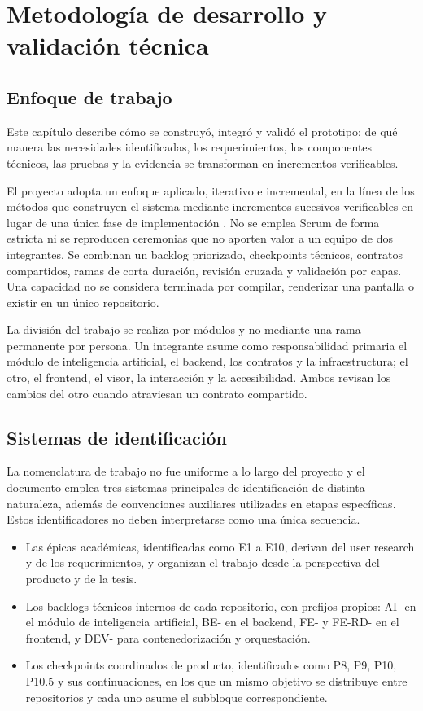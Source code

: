 \chapter{Metodología de desarrollo y validación técnica}
\label{chap:metodologia-validacion}

\section{Enfoque de trabajo}

Este capítulo describe cómo se construyó, integró y validó el prototipo: de qué manera las necesidades identificadas, los requerimientos, los componentes técnicos, las pruebas y la evidencia se transforman en incrementos verificables.

El proyecto adopta un enfoque aplicado, iterativo e incremental, en la línea de los métodos que construyen el sistema mediante incrementos sucesivos verificables en lugar de una única fase de implementación \parencite{larman_basili_iterative_incremental_2003}. No se emplea Scrum de forma estricta ni se reproducen ceremonias que no aporten valor a un equipo de dos integrantes. Se combinan un backlog priorizado, checkpoints técnicos, contratos compartidos, ramas de corta duración, revisión cruzada y validación por capas. Una capacidad no se considera terminada por compilar, renderizar una pantalla o existir en un único repositorio.

La división del trabajo se realiza por módulos y no mediante una rama permanente por persona. Un integrante asume como responsabilidad primaria el módulo de inteligencia artificial, el backend, los contratos y la infraestructura; el otro, el frontend, el visor, la interacción y la accesibilidad. Ambos revisan los cambios del otro cuando atraviesan un contrato compartido.

\section{Sistemas de identificación}

La nomenclatura de trabajo no fue uniforme a lo largo del proyecto y el documento emplea tres sistemas principales de identificación de distinta naturaleza, además de convenciones auxiliares utilizadas en etapas específicas. Estos identificadores no deben interpretarse como una única secuencia.

\begin{itemize}
\item Las épicas académicas, identificadas como E1 a E10, derivan del user research y de los requerimientos, y organizan el trabajo desde la perspectiva del producto y de la tesis.
\item Los backlogs técnicos internos de cada repositorio, con prefijos propios: AI- en el módulo de inteligencia artificial, BE- en el backend, FE- y FE-RD- en el frontend, y DEV- para contenedorización y orquestación.
\item Los checkpoints coordinados de producto, identificados como P8, P9, P10, P10.5 y sus continuaciones, en los que un mismo objetivo se distribuye entre repositorios y cada uno asume el subbloque correspondiente.
\end{itemize}

